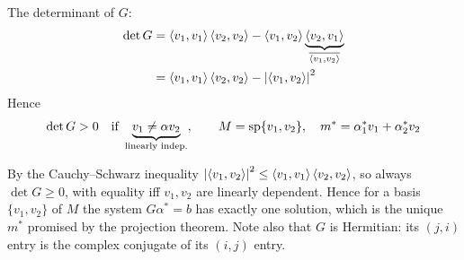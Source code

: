 \begin{example}
The determinant of $G$:
\begin{align*}
\det G &= \left\langle v_1, v_1 \right\rangle\left\langle v_2, v_2 \right\rangle - \left\langle v_1, v_2 \right\rangle\underbrace{\left\langle v_2, v_1 \right\rangle}_{\overline{\left\langle v_1, v_2 \right\rangle}}\\*
&= \left\langle v_1, v_1 \right\rangle\left\langle v_2, v_2 \right\rangle - \left\lvert \left\langle v_1, v_2 \right\rangle \right\rvert^2
\end{align*}
Hence
\begin{gather*}
\det G > 0 \quad \text{if } \underbrace{v_1\neq \alpha v_2}_{\text{linearly indep.}}, \qquad
M = \operatorname{sp}\{v_1,v_2\}, \quad m^* = \alpha_1^* v_1 + \alpha_2^* v_2
\end{gather*}
\begin{insight}
By the Cauchy--Schwarz inequality $\left\lvert \left\langle v_1, v_2 \right\rangle \right\rvert^2\le\left\langle v_1, v_1 \right\rangle\left\langle v_2, v_2 \right\rangle$, so always
$\det G\ge 0$, with equality iff $v_1,v_2$ are linearly dependent. Hence for a basis $\{v_1,v_2\}$ of $M$ the
system $G\alpha^*=b$ has exactly one solution, which is the unique $m^*$ promised by the projection theorem.
Note also that $G$ is Hermitian: its $(j,i)$ entry is the complex conjugate of its $(i,j)$ entry.
\end{insight}
\end{example}

